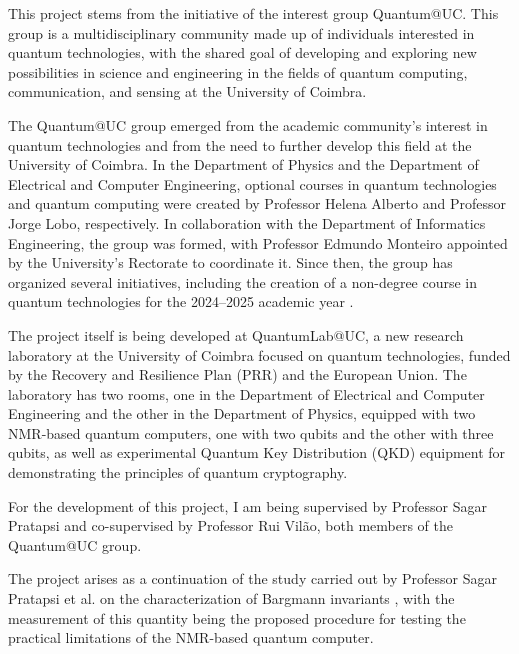 This project stems from the initiative of the interest group Quantum@UC. This group is a multidisciplinary community made up of individuals interested in quantum technologies, with the shared goal of developing and exploring new possibilities in science and engineering in the fields of quantum computing, communication, and sensing at the University of Coimbra.

The Quantum@UC group emerged from the academic community’s interest in quantum technologies and from the need to further develop this field at the University of Coimbra. In the Department of Physics and the Department of Electrical and Computer Engineering, optional courses in quantum technologies and quantum computing were created by Professor Helena Alberto and Professor Jorge Lobo, respectively. In collaboration with the Department of Informatics Engineering, the group was formed, with Professor Edmundo Monteiro appointed by the University’s Rectorate to coordinate it. Since then, the group has organized several initiatives, including the creation of a non-degree course in quantum technologies for the 2024–2025 academic year \cite{QuantumUC_about}.

The project itself is being developed at QuantumLab@UC, a new research laboratory at the University of Coimbra focused on quantum technologies, funded by the Recovery and Resilience Plan (PRR) and the European Union. The laboratory has two rooms, one in the Department of Electrical and Computer Engineering and the other in the Department of Physics, equipped with two NMR-based quantum computers, one with two qubits and the other with three qubits, as well as experimental Quantum Key Distribution (QKD) equipment for demonstrating the principles of quantum cryptography.

For the development of this project, I am being supervised by Professor Sagar Pratapsi and co-supervised by Professor Rui Vilão, both members of the Quantum@UC group.

The project arises as a continuation of the study carried out by Professor Sagar Pratapsi et al. on the characterization of Bargmann invariants \cite{Pratapsi2025elementary}, with the measurement of this quantity being the proposed procedure for testing the practical limitations of the NMR-based quantum computer.